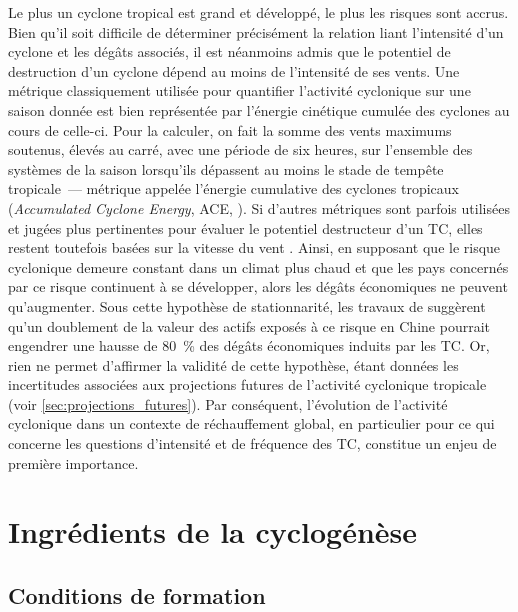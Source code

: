 \documentclass[../main.tex]{subfiles}
\begin{document}
Le plus un cyclone tropical est grand et développé, le plus les risques sont accrus. Bien qu'il soit difficile de déterminer précisément la relation liant l'intensité d'un cyclone et les dégâts associés, il est néanmoins admis que le potentiel de destruction d'un cyclone dépend au moins de
l'intensité de ses vents. Une métrique classiquement utilisée pour quantifier l'activité cyclonique sur une saison donnée est bien représentée par l'énergie cinétique cumulée des cyclones au cours de celle-ci. Pour la calculer, on fait la somme
des vents maximums soutenus, élevés au carré, avec une période de six heures, sur l'ensemble des systèmes de la saison lorsqu'ils dépassent au moins le stade de
tempête tropicale~--- métrique appelée l'énergie cumulative des cyclones tropicaux (\textit{Accumulated Cyclone Energy}, ACE, \cite{bell_climate_2000}). Si
d'autres métriques sont parfois utilisées et jugées plus pertinentes pour évaluer le potentiel destructeur d'un TC, elles restent toutefois basées sur la
vitesse du vent \parencite{powell_tropical_2007}. Ainsi, en supposant que le risque cyclonique demeure constant dans un climat plus chaud et que les pays
concernés par ce risque continuent à se développer, alors les dégâts économiques ne peuvent qu'augmenter. Sous cette hypothèse de stationnarité, les travaux de
\cite{ye_dependence_2020} suggèrent qu'un doublement de la valeur des actifs exposés à ce risque en Chine pourrait engendrer une hausse de \SI{80}{\percent} des
dégâts économiques induits par les TC. Or, rien ne permet d'affirmer la validité de cette hypothèse, étant données les incertitudes associées aux projections
futures de l'activité cyclonique tropicale (voir \cref{sec:projections_futures}). Par conséquent, l'évolution de l'activité cyclonique dans un contexte de
réchauffement global, en particulier pour ce qui concerne les questions d'intensité et de fréquence des TC, constitue un enjeu de première importance.

\section{Ingrédients de la cyclogénèse}
  
\subsection{Conditions de formation}\label{sec:conditions_cyclogenese}
\end{document}
